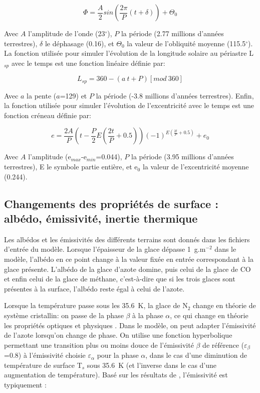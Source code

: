 \begin{equation}
\Phi = \frac{A}{2} sin(\frac{2\pi}{P}(t+\delta))+\Theta_{0}
\end{equation}

Avec $A$ l’amplitude de l’onde (23$^{\circ}$), $P$ la période (2.77 millions d’années terrestres), $\delta$ le déphasage (0.16), et $\Theta_{0}$ la valeur de l’obliquité moyenne (115.5$^{\circ}$).
La fonction utilisée pour simuler l’évolution de la longitude solaire au périastre L$_{sp}$ avec le temps est une fonction linéaire définie par:

\begin{equation}
L_{sp} = 360-(a~t+P)[mod~360]
\end{equation}

Avec $a$ la pente ($a$=129) et $P$ la période (-3.8 millions d’années terrestres).
Enfin, la fonction utilisée pour simuler l’évolution de l’excentricité avec le temps est une fonction créneau définie par:

\begin{equation}
e=\frac{2A}{P} (t - \frac{P}{2}E(\frac{2t}{P}+0.5) )(-1)^{E(\frac{2t}{P}+0.5)}+e_0
\end{equation}

Avec $A$ l’amplitude (e$_{max}$-e$_{min}$=0.044), $P$ la période (3.95 millions d’années terrestres), E le symbole partie entière, et e$_0$ la valeur de l’excentricité moyenne (0.244).

\subsection{Changements des propriétés de surface : albédo, émissivité, inertie thermique}
\label{changesurf}

Les albédos et les émissivités des différents terrains sont donnés dans les fichiers d’entrée du modèle. Lorsque l'épaisseur de la glace dépasse 1~g.m$^{-2}$ dans le modèle, l’albédo en ce point change à la valeur fixée en entrée correspondant à la glace présente. L’albédo de la glace d’azote domine, puis celui de la glace de CO et enfin celui de la glace de méthane, c’est-à-dire que si les trois glaces sont présentes à la surface, l’albédo reste égal à celui de l’azote. 

Lorsque la température passe sous les 35.6~K, la glace de N$_2$ change en théorie de système cristallin: on passe de la phase $\beta$ à la phase $\alpha$, ce qui change en théorie les propriétés optiques \citep{Phil:16} et physiques \citep{Stan:99}. Dans le modèle, on peut adapter l’émissivité de l’azote lorsqu’on change de phase. On utilise une fonction hyperbolique permettant une transition plus ou moins douce de l’émissivité $\beta$ de référence ($\varepsilon_\beta$=0.8) à l’émissivité choisie $\varepsilon_\alpha$ pour la phase $\alpha$, dans le cas d’une diminution de température de surface T$_s$ sous 35.6~K (et l’inverse dans le cas d’une augmentation de température). Basé sur les résultats de \citet{Stan:99}, l’émissivité est typiquement :

